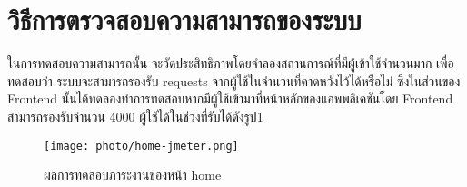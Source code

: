 \section{วิธีการตรวจสอบความสามารถของระบบ}
ในการทดสอบความสามารถนั้น จะวัดประสิทธิภาพโดยจำลองสถานการณ์ที่มีผู้เข้าใช้จำนวนมาก เพื่อทดสอบว่า ระบบจะสามารถรองรับ requests จากผู้ใช้ในจำนวนที่คาดหวังไว้ได้หรือไม่
ซึ่งในส่วนของ Frontend นั้นได้ทดลองทำการทดสอบหากมีผู้ใช้เข้ามาที่หน้าหลักของแอพพลิเคชันโดย Frontend สามารถรองรับจำนวน 4000 ผู้ใช้ได้ในช่วงที่รับได้ดังรูป\ref{fig:homejmeter}
\begin{figure}[ht]
\begin{center}
    \texttt{[image: photo/home-jmeter.png]}
\end{center}
\caption{ผลการทดสอบภาระงานของหน้า home}
\label{fig:homejmeter}
\end{figure}